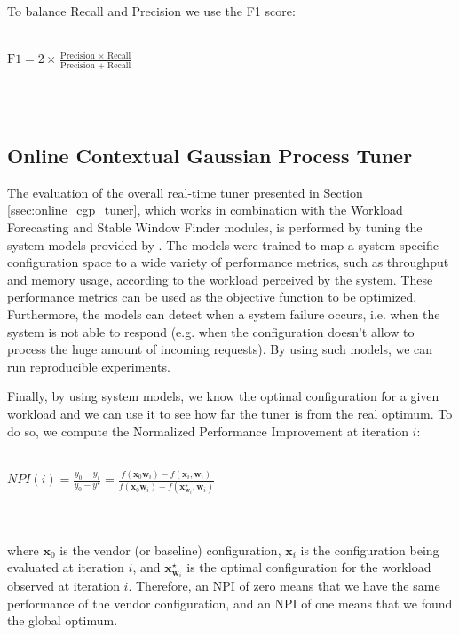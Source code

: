 \documentclass[a4paper, 12pt]{article} %
\begin{document}
	To balance Recall and Precision we use the F1 score:\\\\
	\centerline{
		$
		\text{F1} = 2 \times \frac{ \text{Precision } \times \text{ Recall}}{\text{Precision } + \text{ Recall}}
		$
	}\\\\
	
	\subsection{Online Contextual Gaussian Process Tuner } \label{ssec:exp_online_cgp}
	The evaluation of the overall real-time tuner presented in Section \ref{ssec:online_cgp_tuner}, which works in combination with the Workload Forecasting and Stable Window Finder modules, is performed by tuning the system models provided by \cite{AkamasCGP}. The models were trained to map a system-specific configuration space to a wide variety of performance metrics, such as throughput and memory usage, according to the workload perceived by the system. These performance metrics can be used as the objective function to be optimized. Furthermore, the models can detect when a system failure occurs, i.e. when the system is not able to respond (e.g. when the configuration doesn't allow to process the huge amount of incoming requests). By using such models, we can run reproducible experiments.
	
	Finally, by using system models, we know the optimal configuration for a given workload and we can use it to see how far the tuner is from the real optimum. To do so, we compute the Normalized Performance Improvement at iteration $i$:\\\\
	\centerline{
		$
		NPI(i) = \frac{y_0 - y_i}{y_0 - y^\star} = \frac{f(\pmb{x}_0 \pmb{w}_i) - f(\pmb{x}_i, \pmb{w}_i)}{f(\pmb{x}_0 \pmb{w}_i) - f(\pmb{x}_{\pmb{w}_i}^\star, \pmb{w}_i)}
		$
	}\\\\
	where $\pmb{x}_0$ is the vendor (or baseline) configuration, $\pmb{x}_i$ is the configuration being evaluated at iteration $i$, and $\pmb{x}_{\pmb{w}_i}^\star$ is the optimal configuration for the workload observed at iteration $i$. Therefore, an NPI of zero means that we have the same performance of the vendor configuration, and an NPI of one means that we found the global optimum. 
	
\end{document}
